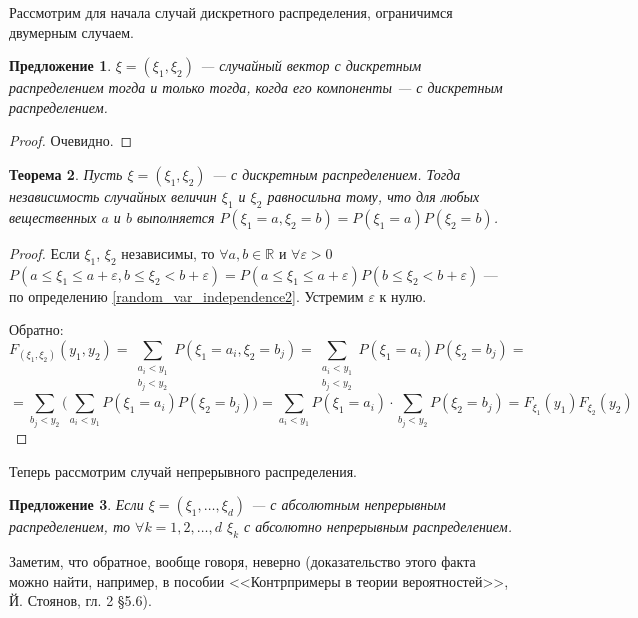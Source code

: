 \documentclass[11pt,openany,a4paper]{scrartcl}
\theoremstyle{plain}
\newtheorem{theorem}{Теорема}[subsection]
\newtheorem{proposition}[theorem]{Предложение}
\theoremstyle{definition}
\newcommand\mb{\mathbb}
\newcommand\real{\mb R}
\begin{document}
Рассмотрим для начала случай дискретного распределения, ограничимся двумерным 
случаем.

\begin{proposition}
    $\xi = (\xi_1, \xi_2)$ — случайный вектор с дискретным распределением
    тогда и только тогда, когда его компоненты — с дискретным распределением.
\end{proposition}
\begin{proof}
    Очевидно.
\end{proof}

\begin{theorem}
    Пусть $\xi = (\xi_1, \xi_2)$ — с дискретным распределением.
    Тогда независимость
    случайных величин $\xi_1$ и $\xi_2$ равносильна тому, что для любых 
    вещественных $a$ и $b$ выполняется $P(\xi_1 = a, \xi_2 = b) =
    P(\xi_1 = a)P(\xi_2 = b)$.
\end{theorem}
\begin{proof}
        Если $\xi_1$, $\xi_2$ независимы, то
        $\forall a,b \in \real$ и $\forall \varepsilon > 0$
        $P(a \leqslant \xi_1 \leqslant a + \varepsilon,
        b \leqslant \xi_2 < b + \varepsilon) =
        P(a \leqslant \xi_1 \leqslant a + \varepsilon)
        P(b \leqslant \xi_2 < b + \varepsilon)$ — по определению 
        \ref{random_var_independence2}. Устремим $\varepsilon$ к нулю.
        
        Обратно:
        $$
        F_{(\xi_1, \xi_2)}(y_1, y_2) =
        \sum\limits_{\substack{a_i < y_1\\b_j < y_2}} P(\xi_1 = a_i, \xi_2 = b_j) =
        \sum\limits_{\substack{a_i < y_1\\b_j < y_2}} P(\xi_1 = a_i)P(\xi_2 = b_j) =
        $$
        $$
        = \sum\limits_{b_j < y_2}\Bigg(\sum\limits_{a_i < y_1}
        P(\xi_1 = a_i)P(\xi_2 = b_j)\Bigg) =
        \sum\limits_{a_i < y_1} P(\xi_1 = a_i) \cdot
        \sum\limits_{b_j < y_2} P(\xi_2 = b_j) =
        F_{\xi_1}(y_1) F_{\xi_2}(y_2)
        $$
\end{proof}

Теперь рассмотрим случай непрерывного распределения.

\begin{proposition}
    Если $\xi = (\xi_1, \ldots, \xi_d)$ — с абсолютным непрерывным распределением,
    то $\forall k = 1, 2,\ldots, d$ $\xi_k$ с абсолютно непрерывным 
    распределением.
\end{proposition}

Заметим, что обратное, вообще говоря, неверно (доказательство этого факта можно
найти, например, в пособии
<<Контрпримеры в теории вероятностей>>, Й. Стоянов, гл. 2 §5.6).
\end{document}
